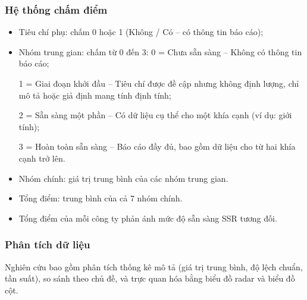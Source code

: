 \subsubsection{Hệ thống chấm điểm}
\begin{itemize}
\item Tiêu chí phụ: chấm 0 hoặc 1 (Không / Có – có thông tin báo cáo);
\item Nhóm trung gian: chấm từ 0 đến 3:
    \hspace{1cm} 0 = Chưa sẵn sàng – Không có thông tin báo cáo;  
    
    \hspace{1cm} 1 = Giai đoạn khởi đầu – Tiêu chí được đề cập nhưng không định lượng, chỉ mô tả hoặc giả định mang tính định tính;  
    
    \hspace{1cm} 2 = Sẵn sàng một phần – Có dữ liệu cụ thể cho một khía cạnh (ví dụ: giới tính);  
    
    \hspace{1cm} 3 = Hoàn toàn sẵn sàng – Báo cáo đầy đủ, bao gồm dữ liệu cho từ hai khía cạnh trở lên.  

\item Nhóm chính: giá trị trung bình của các nhóm trung gian.  
\item Tổng điểm: trung bình của cả 7 nhóm chính.  
\item Tổng điểm của mỗi công ty phản ánh mức độ sẵn sàng SSR tương đối.  

\end{itemize}

\subsubsection{Phân tích dữ liệu}
Nghiên cứu bao gồm phân tích thống kê mô tả (giá trị trung bình, độ lệch chuẩn, tần suất), so sánh theo chủ đề, và trực quan hóa bằng biểu đồ radar và biểu đồ cột.


